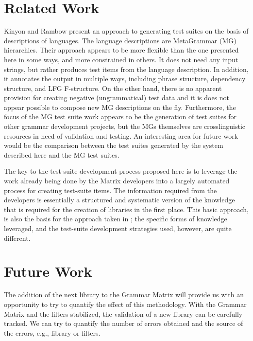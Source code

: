 \documentclass[11pt]{article}
\begin{document}
\section{Related Work}
\label{rw}
Kinyon and Rambow  present an approach to
generating test suites on the basis of descriptions of languages.  The
language descriptions are MetaGrammar (MG) hierarchies. Their approach
appears to be more flexible than the one presented here in some ways,
and more constrained in others.  It does not need any input strings,
but rather produces test items from the language description. In
addition, it annotates the output in multiple ways, including phrase
structure, dependency structure, and LFG F-structure.  On the other
hand, there is no apparent provision for creating negative
(ungrammatical) test data and it is does not appear possible to
compose new MG descriptions on the fly.  Furthermore, the focus of the
MG test suite work appears to be the generation of test suites for
other grammar development projects, but the MGs themselves are
crosslinguistic resources in need of validation and testing. An
interesting area for future work would be the comparison between the
test suites generated by the system described here and the MG test
suites.

The key to the test-suite development process proposed here is to
leverage the work already being done by the Matrix developers into a
largely automated process for creating test-suite items. The
information required from the developers is essentially a structured
and systematic version of the knowledge that is required for the
creation of libraries in the first place.  This basic
approach, is also the basis for the approach taken in
\cite{bro:00}; the specific forms of knowledge leveraged, and the
test-suite development strategies used, however, are quite different.



\section{Future Work}

The addition of the next library to the Grammar Matrix will provide
us with an opportunity to try to quantify the effect of this
methodology.  With the Grammar Matrix and the filters stabilized, the
validation of a new library can be carefully tracked.  We can try to
quantify the number of errors obtained and the source of the errors,
e.g., library or filters.
\end{document}
